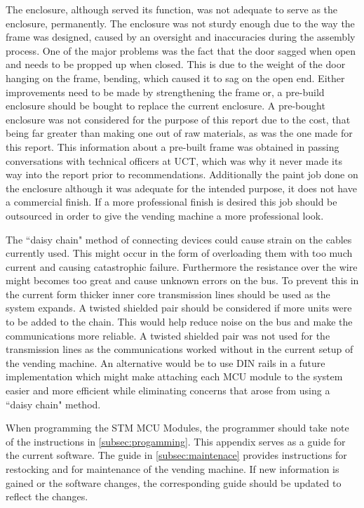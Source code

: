 \documentclass[a4paper,11pt]{article}
\numberwithin{figure}{section}
\numberwithin{table}{section}
\begin{document}
The enclosure, although served its function, was not adequate to serve as the enclosure, permanently. The enclosure was not sturdy enough due to the way the frame was designed, caused by an oversight and inaccuracies during the assembly process. One of the major problems was the fact that the door sagged when open and needs to be propped up when closed. This is due to the weight of the door hanging on the frame, bending, which caused it to sag on the open end. Either improvements need to be made by strengthening the frame or, a pre-build enclosure should be bought to replace the current enclosure. A pre-bought enclosure was not considered for the purpose of this report due to the cost, that being far greater than making one out of raw materials, as was the one made for this report. This information about a pre-built frame was obtained in passing conversations with technical officers at UCT, which was why it never made its way into the report prior to recommendations. Additionally the paint job done on the enclosure although it was adequate for the intended purpose, it does not have a commercial finish. If a more professional finish is desired this job should be outsourced in order to give the vending machine a more professional look.

The ``daisy chain" method of connecting devices could cause strain on the cables currently used. This might occur in the form of overloading them with too much current and causing catastrophic failure. Furthermore the resistance over the wire might becomes too great and cause unknown errors on the bus. To prevent this in the current form thicker inner core transmission lines should be used as the system expands. A twisted shielded pair should be considered if more units were to be added to the chain. This would help reduce noise on the bus and make the communications more reliable. A twisted shielded pair was not used for the transmission lines as the communications worked without in the current setup of the vending machine. An alternative would be to use DIN rails in a future implementation which might make attaching each MCU module to the system easier and more efficient while eliminating concerns that arose from using a ``daisy chain" method.

When programming the STM MCU Modules, the programmer should take note of the instructions in \autoref{subsec:progamming}. This appendix serves as a guide for the current software. The guide in \autoref{subsec:maintenace} provides instructions for restocking and for maintenance of the vending machine. If new information is gained or the software changes, the corresponding guide should be updated to reflect the changes.
\end{document}
